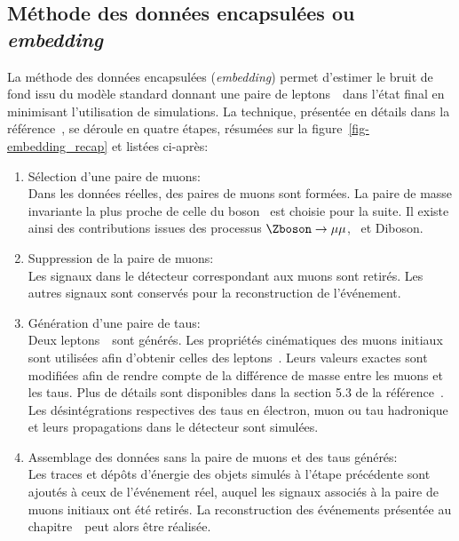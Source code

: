 \subsection{Méthode des données encapsulées ou \emph{embedding}}\label{chapter-HTT_analysis-section-bg_estimation-embedding}
La méthode des données encapsulées (\emph{embedding}) permet d'estimer le bruit de fond issu du modèle standard donnant une paire de leptons~\tau\ dans l'état final en minimisant l'utilisation de simulations.
La technique, présentée en détails dans la référence~\cite{embedding}, se déroule en quatre étapes, résumées sur la figure~\ref{fig-embedding_recap} et listées ci-après:
\begin{enumerate}
\item Sélection d'une paire de muons:\\
Dans les données réelles, des paires de muons sont formées.
La paire de masse invariante la plus proche de celle du boson \Zboson\ est choisie pour la suite.
Il existe ainsi des contributions issues des processus $\Zboson\to\mu\mu$, \ttbar\ et Diboson.
\item Suppression de la paire de muons:\\
Les signaux dans le détecteur correspondant aux muons sont retirés.
Les autres signaux sont conservés pour la reconstruction de l'événement.
\item Génération d'une paire de taus:\\
Deux leptons~\tau\ sont générés.
Les propriétés cinématiques des muons initiaux sont utilisées afin d'obtenir celles des leptons~\tau.
Leurs valeurs exactes sont modifiées afin de rendre compte de la différence de masse entre les muons et les taus.
Plus de détails sont disponibles dans la section 5.3 de la référence~\cite{embedding}.
Les désintégrations respectives des taus en électron, muon ou tau hadronique et leurs propagations dans le détecteur sont simulées.
\item Assemblage des données sans la paire de muons et des taus générés:\\
Les traces et dépôts d'énergie des objets simulés à l'étape précédente sont ajoutés à ceux de l'événement réel, auquel les signaux associés à la paire de muons initiaux ont été retirés.
La reconstruction des événements présentée au chapitre~\ peut alors être réalisée.
\end{enumerate}
